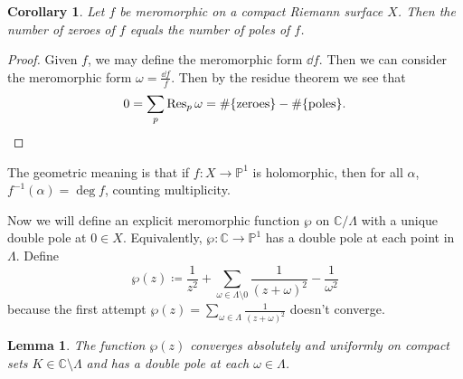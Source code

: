 \documentclass[leqno, openany]{memoir}
\newtheorem{cor}[thm]{Corollary}
\newtheorem{lem}[thm]{Lemma}
\theoremstyle{definition}
\theoremstyle{remark}
\theoremstyle{plain}
\theoremstyle{definition}
\theoremstyle{remark}
\newcommand{\C}{\mathbb{C}}
\renewcommand{\P}{\mathbb{P}}
\begin{document}
\begin{cor}
    Let $f$ be meromorphic on a compact Riemann surface $X$. Then the number of zeroes of $f$ equals the number of poles of $f$.
\end{cor}

\begin{proof}
    Given $f$, we may define the meromorphic form $\dd{f}$. Then we can consider the meromorphic form $\omega = \frac{\dd{f}}{f}$. Then by the residue theorem we see that
    \[ 0 = \sum_p \Res_p \omega = \# \qty{\text{zeroes}} - \# \qty{\text{poles}}. \qedhere \]
\end{proof}

The geometric meaning is that if $f \colon X \to \P^1$ is holomorphic, then for all $\alpha$, $f^{-1}(\alpha) = \deg f$, counting multiplicity.

Now we will define an explicit meromorphic function $\wp$ on $\C/\Lambda$ with a unique double pole at $0 \in X$. Equivalently, $\wp \colon \C \to \P^1$ has a double pole at each point in $\Lambda$. Define
\[ \wp(z) \coloneqq \frac{1}{z^2} + \sum_{\omega \in \Lambda \setminus \qty{0}} \frac{1}{{(z+\omega)}^2} - \frac{1}{\omega^2} \]
because the first attempt $\wp(z) = \sum_{\omega \in \Lambda} \frac{1}{{(z+\omega)}^2}$ doesn't converge.

\begin{lem}
    The function $\wp(z)$ converges absolutely and uniformly on compact sets $K \in \C \setminus \Lambda$ and has a double pole at each $\omega \in \Lambda$.
\end{lem}
\end{document}
